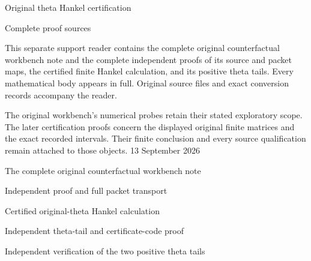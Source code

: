 \documentclass[10pt,a4paper]{article}
\begin{document}
\hypersetup{pageanchor=false}
\begin{titlepage}
\vspace*{25mm}
{\sffamily\LARGE Original theta Hankel certification\par}
\vspace{8mm}
{\sffamily\Large Complete proof sources\par}
\vspace{12mm}
This separate support reader contains the complete original counterfactual
workbench note and the complete independent proofs of its source and packet
maps, the certified finite Hankel calculation, and its positive theta tails.
Every mathematical body appears in full. Original source files and exact
conversion records accompany the reader.

The original workbench's numerical probes retain their stated exploratory
scope. The later certification proofs concern the displayed original finite
matrices and the exact recorded intervals. Their finite conclusion and every
source qualification remain attached to those objects.
\vfill
13 September 2026
\end{titlepage}
\hypersetup{pageanchor=true}
\tableofcontents
\clearpage
{}

\clearpage
{}
{}
{\sffamily\Large The complete original counterfactual workbench note\par}
\medskip


\clearpage
{}
{}
{\sffamily\Large Independent proof and full packet transport\par}
\medskip


\clearpage
{}
{}
{\sffamily\Large Certified original-theta Hankel calculation\par}
\medskip


\clearpage
{}
{}
{\sffamily\Large Independent theta-tail and certificate-code proof\par}
\medskip


\clearpage
{}
{}
{\sffamily\Large Independent verification of the two positive theta tails\par}
\medskip

\end{document}
